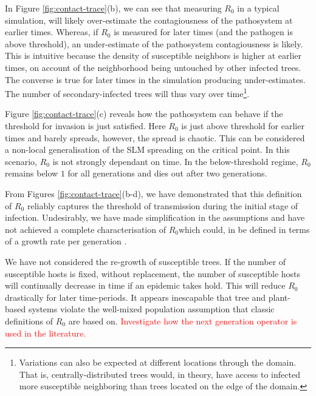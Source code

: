 \begin{fi}
In Figure \ref{fig:contact-trace}(b), we can see that measuring $R_0$ in a typical simulation, %
will likely over-estimate the contagiousness of the pathosystem at earlier times. %
Whereas, if $R_0$ is measured for later times (and the pathogen is above threshold), an %
under-estimate of the pathosystem contagiousness is likely. %
This is intuitive because the density of susceptible neighbors is higher at earlier times, %
on account of the neighborhood being untouched by other infected trees. %
The converse is true for later times in the simulation producing under-estimates. %
The number of secondary-infected trees will thus vary over time\footnote{Variations can %
also be expected at different locations through the domain. That is, centrally-distributed %
trees would, in theory, have access to infected more susceptible neighboring than trees %
located on the edge of the domain.}. %

Figure \ref{fig:contact-trace}(c) reveals how the pathosystem can behave if the threshold for %
invasion is just satisfied. %
Here $R_0$ is just above threshold for earlier times and barely spreads, however, the spread is chaotic. %
This can be considered a non-local generalisation of the SLM spreading on the critical point. %
In this scenario, $R_0$ is not strongly dependant on time. %
In the below-threshold regime, $R_0$ remains below $1$ for all generations and dies out after %
two generations. %

From Figures \ref{fig:contact-trace}(b-d), we have demonstrated that this definition of $R_0$ %
reliably captures the threshold of transmission during the initial stage of infection. %
Undesirably, we have made simplification in the assumptions and have not achieved a complete %
characterisation of $R_0$\textemdash which could, in be defined in terms of a growth %
rate per generation \cite{R0-construct}. %

We have not considered the re-growth of susceptible trees. %
If the number of susceptible hosts is fixed, without replacement, the number of susceptible hosts %
will continually decrease in time if an epidemic takes hold. %
This will reduce $R_0$ drastically for later time-periods. %
It appears inescapable that tree and plant-based systems violate the well-mixed population %
assumption that classic definitions of $R_0$ are based on. %
\textcolor{red}{Investigate how the next generation operator is used in the literature.}\\



\end{fi}
